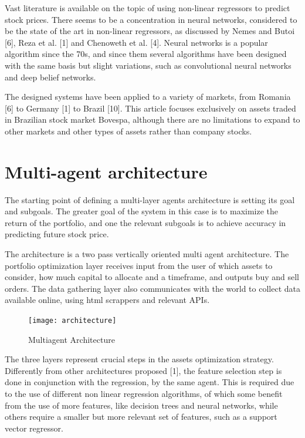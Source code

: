 \documentclass[prodmode,acmtecs]{acmsmall} %
\begin{document}
Vast literature is available on the topic of using non-linear regressors to predict stock prices. There seems to be a concentration in neural networks, considered to be the state of the art in non-linear regressors, as discussed by Nemes and Butoi [6], Reza et al. [1] and Chenoweth et al. [4]. Neural networks is a popular algorithm since the 70s, and since them several algorithms have been designed with the same basis but slight variations, such as convolutional neural networks and deep belief networks.

The designed systems have been applied to a variety of markets, from Romania [6] to Germany [1] to Brazil [10]. This article focuses exclusively on assets traded in Brazilian stock market Bovespa, although there are no limitations to expand to other markets and other types of assets rather than company stocks.

\section{Multi-agent architecture} 

The starting point of defining a multi-layer agents architecture is setting its goal and subgoals. The greater goal of the system in this case is to maximize the return of the portfolio, and one the relevant subgoals is to achieve accuracy in predicting future stock price.

The architecture is a two pass vertically oriented multi agent architecture. The portfolio optimization layer receives input from the user of which assets to consider, how much capital to allocate and a timeframe, and outputs buy and sell orders. The data gathering layer also communicates with the world to collect data available online, using html scrappers and relevant APIs. 

\begin{figure}
	\centering
	\texttt{[image: architecture]}
	\caption{Multiagent Architecture}
	\label{fig:one}
\end{figure}

The three layers represent crucial steps in the assets optimization strategy. Differently from other architectures proposed [1], the feature selection step is done in conjunction with the regression, by the same agent. This is required due to the use of different non linear regression algorithms, of which some benefit from the use of more features, like decision trees and neural networks, while others require a smaller but more relevant set of features, such as a support vector regressor.
\end{document}
